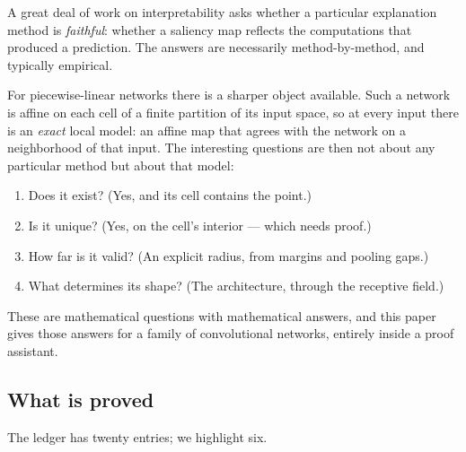 \documentclass[11pt]{article}
\begin{document}
A great deal of work on interpretability asks whether a particular explanation
method is \emph{faithful}: whether a saliency map reflects the computations
that produced a prediction. The answers are necessarily method-by-method, and
typically empirical.

For piecewise-linear networks there is a sharper object available. Such a
network is affine on each cell of a finite partition of its input space, so at
every input there is an \emph{exact} local model: an affine map that agrees
with the network on a neighborhood of that input. The interesting questions are
then not about any particular method but about that model:

\begin{enumerate}
\item Does it exist? (Yes, and its cell contains the point.)
\item Is it unique? (Yes, on the cell's interior --- which needs proof.)
\item How far is it valid? (An explicit radius, from margins and pooling gaps.)
\item What determines its shape? (The architecture, through the receptive
  field.)
\end{enumerate}

These are mathematical questions with mathematical answers, and this paper
gives those answers for a family of convolutional networks, entirely inside a
proof assistant.

\subsection{What is proved}

The ledger has twenty entries; we highlight six.
\end{document}
